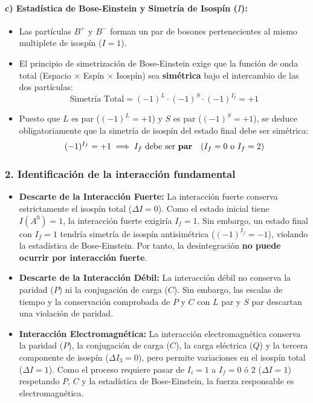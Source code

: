 \begin{problema}
\paragraph{c) Estadística de Bose-Einstein y Simetría de Isospín ($I$):}
\begin{itemize}
    \item Las partículas $B^+$ y $B^-$ forman un par de bosones pertenecientes al mismo multiplete de isospín ($I = 1$).
    \item El principio de simetrización de Bose-Einstein exige que la función de onda total (Espacio $\times$ Espín $\times$ Isospín) sea \textbf{simétrica} bajo el intercambio de las dos partículas:
    \begin{equation*}
    \text{Simetría Total} = (-1)^L \cdot (-1)^S \cdot (-1)^{I_f} = +1
    \end{equation*}
    \item Puesto que $L$ es par ($(-1)^L = +1$) y $S$ es par ($(-1)^S = +1$), se deduce obligatoriamente que la simetría de isospín del estado final debe ser simétrica:
    \begin{equation*}
    (-1)^{I_f} = +1 \implies I_f \text{ debe ser \textbf{par}} \quad (I_f = 0 \text{ o } I_f = 2)
    \end{equation*}
\end{itemize}

\subsubsection*{2. Identificación de la interacción fundamental}

\begin{itemize}
    \item \textbf{Descarte de la Interacción Fuerte:} La interacción fuerte conserva estrictamente el isospín total ($\Delta I = 0$). Como el estado inicial tiene $I(A^0) = 1$, la interacción fuerte exigiría $I_f = 1$. Sin embargo, un estado final con $I_f = 1$ tendría simetría de isospín antisimétrica ($(-1)^{I_f} = -1$), violando la estadística de Bose-Einstein. Por tanto, la desintegración \textbf{no puede ocurrir por interacción fuerte}.
    \item \textbf{Descarte de la Interacción Débil:} La interacción débil no conserva la paridad ($P$) ni la conjugación de carga ($C$). Sin embargo, las escalas de tiempo y la conservación comprobada de $P$ y $C$ con $L$ par y $S$ par descartan una violación de paridad.
    \item \textbf{Interacción Electromagnética:} La interacción electromagnética conserva la paridad ($P$), la conjugación de carga ($C$), la carga eléctrica ($Q$) y la tercera componente de isospín ($\Delta I_3 = 0$), pero permite variaciones en el isospín total ($\Delta I = 1$). Como el proceso requiere pasar de $I_i = 1$ a $I_f = 0$ ó $2$ ($\Delta I = 1$) respetando $P$, $C$ y la estadística de Bose-Einstein, la fuerza responsable es electromagnética.
\end{itemize}


\end{problema}
